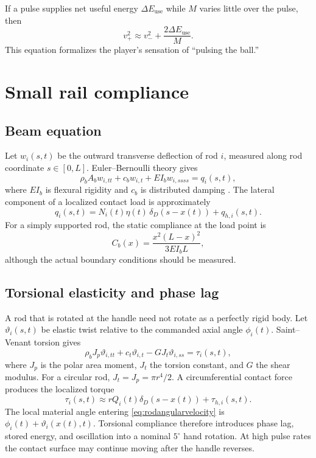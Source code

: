 \documentclass[11pt]{article}
\numberwithin{equation}{section}
\theoremstyle{definition}
\theoremstyle{remark}
\begin{document}
If a pulse supplies net useful energy $\Delta E_{\mathrm{use}}$ while $M$ varies little over the pulse, then
\begin{equation}
  v_+^2\approx v_-^2+\frac{2\Delta E_{\mathrm{use}}}{M}.
  \label{eq:pulsespeed}
\end{equation}
This equation formalizes the player's sensation of ``pulsing the ball.''

\section{Small rail compliance}

\subsection{Beam equation}

Let $w_i(s,t)$ be the outward transverse deflection of rod $i$, measured along rod coordinate $s\in[0,L]$.  Euler--Bernoulli theory gives
\begin{equation}
  \rho_bA_bw_{i,tt}+c_bw_{i,t}+EI_bw_{i,ssss}=q_i(s,t),
  \label{eq:beam}
\end{equation}
where $EI_b$ is flexural rigidity and $c_b$ is distributed damping \citep{Meirovitch2001}.  The lateral component of a localized contact load is approximately
\begin{equation}
  q_i(s,t)=N_i(t)\eta(t)\,\delta_D(s-x(t))+q_{h,i}(s,t).
  \label{eq:beamload}
\end{equation}
For a simply supported rod, the static compliance at the load point is
\begin{equation}
  C_b(x)=\frac{x^2(L-x)^2}{3EI_bL},
  \label{eq:beamcompliance}
\end{equation}
although the actual boundary conditions should be measured.


\subsection{Torsional elasticity and phase lag}

A rod that is rotated at the handle need not rotate as a perfectly rigid body.  Let $\vartheta_i(s,t)$ be elastic twist relative to the commanded axial angle $\phi_i(t)$.  Saint--Venant torsion gives
\begin{equation}
  \rho_bJ_p\vartheta_{i,tt}
  +c_t\vartheta_{i,t}
  -GJ_t\vartheta_{i,ss}
  =\tau_i(s,t),
  \label{eq:torsionpde}
\end{equation}
where $J_p$ is the polar area moment, $J_t$ the torsion constant, and $G$ the shear modulus.  For a circular rod, $J_t=J_p=\pi r^4/2$.  A circumferential contact force produces the localized torque
\begin{equation}
  \tau_i(s,t)
  \approx rQ_i(t)\delta_D(s-x(t))+\tau_{h,i}(s,t).
  \label{eq:torsionload}
\end{equation}
The local material angle entering \cref{eq:rodangularvelocity} is $\phi_i(t)+\vartheta_i(x(t),t)$.  Torsional compliance therefore introduces phase lag, stored energy, and oscillation into a nominal $5^\circ$ hand rotation.  At high pulse rates the contact surface may continue moving after the handle reverses.
\end{document}
